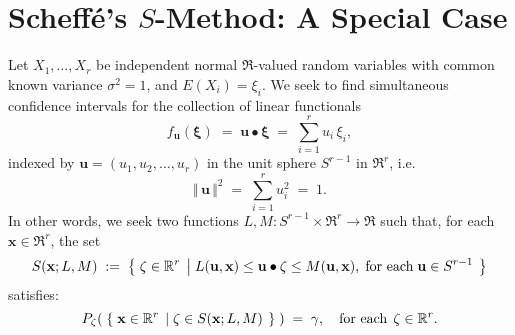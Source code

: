 \section{Scheff\'{e}'s $S$-Method: A Special Case}
\setcounter{theorem}{0}

Let $X_{1}, \ldots, X_{r}$ be independent normal $\Re$-valued random variables with common known
variance $\sigma^{2} = 1$, and $E(X_{i}) = \xi_{i}$.  We seek to find simultaneous confidence
intervals for the collection of linear functionals
\begin{equation*}
f_{\mathbf{u}}(\mathbf{\xi}) \; = \; \mathbf{u} \bullet \mathbf{\xi} \; = \; \sum^{r}_{i=1} u_{i}\,\xi_{i},
\end{equation*}
indexed by $\mathbf{u} = (u_{1},u_{2},\ldots,u_{r})$ in the unit sphere $S^{r-1}$ in $\Re^{r}$, i.e. 
\begin{equation*}
\Vert\,\mathbf{u}\,\Vert^{2} \; = \; \sum^{r}_{i=1} u_{i}^{2} \; = \; 1.
\end{equation*}
In other words, we seek two functions $L,M : S^{r-1} \times \Re^{r} \longrightarrow \Re$ such that,
for each $\mathbf{x} \in \Re^{r}$, the set
\begin{equation*}
S(\mathbf{x};L,M) \; := \;
\left\{\;
\zeta \in \Re^{r}
\;\left\vert\;
L(\mathbf{u},\mathbf{x}) \leq \mathbf{u} \bullet \mathbf{\zeta} \leq M(\mathbf{u},\mathbf{x}),
\;\textnormal{for each}\; \mathbf{u} \in S^{r-1}
\right.
\;\right\}
\end{equation*}
satisfies:
\begin{equation*}
P_{\zeta}\!\left(\;
\left\{\;
\mathbf{x}\in\Re^{r}
\;\left\vert\;
\zeta \in S(\mathbf{x};L,M)
\right.
\;\right\}
\;\right)
\; = \; \gamma,
\quad
\textnormal{for each}\,\; \zeta \in \Re^{r}.
\end{equation*}

